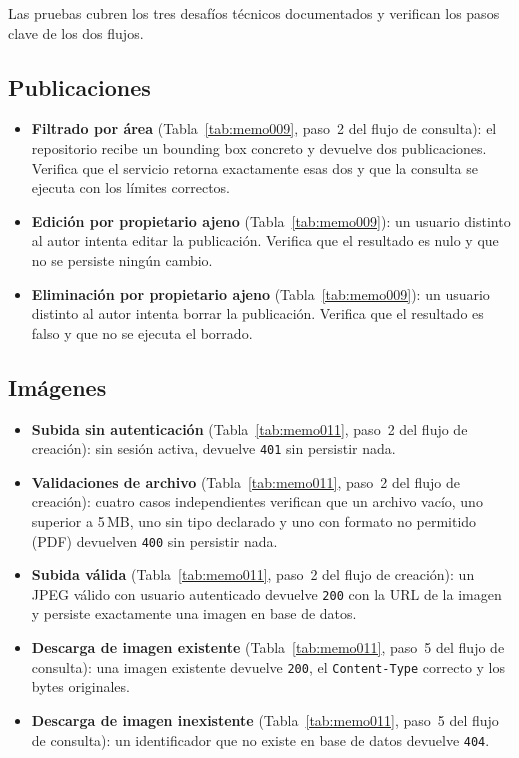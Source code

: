 Las pruebas cubren los tres desafíos técnicos documentados y verifican los pasos clave de los dos flujos.

\subsection*{Publicaciones}

\begin{itemize}
    \item \textbf{Filtrado por área} (Tabla~\ref{tab:memo009}, paso~2 del flujo de consulta): el repositorio recibe un bounding box concreto y devuelve dos publicaciones. Verifica que el servicio retorna exactamente esas dos y que la consulta se ejecuta con los límites correctos.

    \item \textbf{Edición por propietario ajeno} (Tabla~\ref{tab:memo009}): un usuario distinto al autor intenta editar la publicación. Verifica que el resultado es nulo y que no se persiste ningún cambio.

    \item \textbf{Eliminación por propietario ajeno} (Tabla~\ref{tab:memo009}): un usuario distinto al autor intenta borrar la publicación. Verifica que el resultado es falso y que no se ejecuta el borrado.
\end{itemize}

\subsection*{Imágenes}

\begin{itemize}
    \item \textbf{Subida sin autenticación} (Tabla~\ref{tab:memo011}, paso~2 del flujo de creación): sin sesión activa, devuelve \texttt{401} sin persistir nada.

    \item \textbf{Validaciones de archivo} (Tabla~\ref{tab:memo011}, paso~2 del flujo de creación): cuatro casos independientes verifican que un archivo vacío, uno superior a 5\,MB, uno sin tipo declarado y uno con formato no permitido (PDF) devuelven \texttt{400} sin persistir nada.

    \item \textbf{Subida válida} (Tabla~\ref{tab:memo011}, paso~2 del flujo de creación): un JPEG válido con usuario autenticado devuelve \texttt{200} con la URL de la imagen y persiste exactamente una imagen en base de datos.

    \item \textbf{Descarga de imagen existente} (Tabla~\ref{tab:memo011}, paso~5 del flujo de consulta): una imagen existente devuelve \texttt{200}, el \texttt{Content-Type} correcto y los bytes originales.

    \item \textbf{Descarga de imagen inexistente} (Tabla~\ref{tab:memo011}, paso~5 del flujo de consulta): un identificador que no existe en base de datos devuelve \texttt{404}.
\end{itemize}

